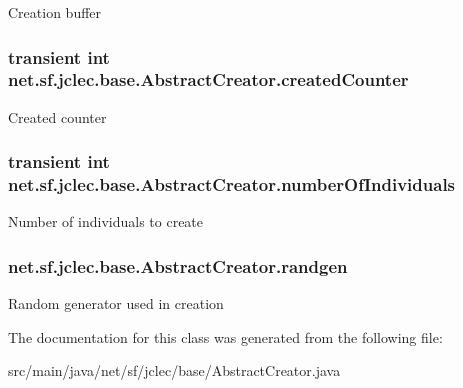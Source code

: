 Creation buffer \hypertarget{classnet_1_1sf_1_1jclec_1_1base_1_1_abstract_creator_a662f9a47a43349b37ff302a5105ca29b}{
\subsubsection[{created\-Counter}]{\setlength{\rightskip}{0pt plus 5cm}transient int net.\-sf.\-jclec.\-base.\-Abstract\-Creator.\-created\-Counter\hspace{0.3cm}{\ttfamily [protected]}}}\label{classnet_1_1sf_1_1jclec_1_1base_1_1_abstract_creator_a662f9a47a43349b37ff302a5105ca29b}
Created counter \hypertarget{classnet_1_1sf_1_1jclec_1_1base_1_1_abstract_creator_afef0fbae3aaff5c5cede8aa5e4e647ca}{
\subsubsection[{number\-Of\-Individuals}]{\setlength{\rightskip}{0pt plus 5cm}transient int net.\-sf.\-jclec.\-base.\-Abstract\-Creator.\-number\-Of\-Individuals\hspace{0.3cm}{\ttfamily [protected]}}}\label{classnet_1_1sf_1_1jclec_1_1base_1_1_abstract_creator_afef0fbae3aaff5c5cede8aa5e4e647ca}
Number of individuals to create \hypertarget{classnet_1_1sf_1_1jclec_1_1base_1_1_abstract_creator_a175271e8ff13e6d72d35c2daa0c75880}{
\subsubsection[{randgen}]{ net.\-sf.\-jclec.\-base.\-Abstract\-Creator.\-randgen\hspace{0.3cm}{\ttfamily [protected]}}}\label{classnet_1_1sf_1_1jclec_1_1base_1_1_abstract_creator_a175271e8ff13e6d72d35c2daa0c75880}
Random generator used in creation 

The documentation for this class was generated from the following file\-:\begin{DoxyCompactItemize}
\item 
src/main/java/net/sf/jclec/base/Abstract\-Creator.\-java\end{DoxyCompactItemize}

